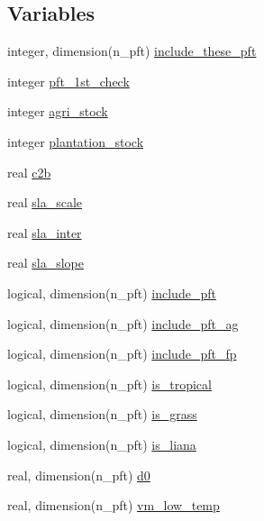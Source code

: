 \subsection*{Variables}
\begin{DoxyCompactItemize}
\item 
integer, dimension(n\+\_\+pft) \hyperlink{namespacepft__coms_a7ab2f215846d8f15e70deeb77fa8802e}{include\+\_\+these\+\_\+pft}
\item 
integer \hyperlink{namespacepft__coms_a46f15da0b9bf81a4f8bdba850efff1c8}{pft\+\_\+1st\+\_\+check}
\item 
integer \hyperlink{namespacepft__coms_afa924efff5f6897a77ef72109bfb8811}{agri\+\_\+stock}
\item 
integer \hyperlink{namespacepft__coms_abade08057c8846615ec5ff4ff9d3ffa2}{plantation\+\_\+stock}
\item 
real \hyperlink{namespacepft__coms_a2613e7dd1fa05af83d058d81f92946ec}{c2b}
\item 
real \hyperlink{namespacepft__coms_a1ba9e47e49347dca3d82a5d2a694136d}{sla\+\_\+scale}
\item 
real \hyperlink{namespacepft__coms_a7f2175fb500b1a4a0558108744ef6da8}{sla\+\_\+inter}
\item 
real \hyperlink{namespacepft__coms_abac97f719f7239eac0e2ad92dc9a8bef}{sla\+\_\+slope}
\item 
logical, dimension(n\+\_\+pft) \hyperlink{namespacepft__coms_a01416a40237dfc9b75e2205ff91ef2be}{include\+\_\+pft}
\item 
logical, dimension(n\+\_\+pft) \hyperlink{namespacepft__coms_a39d76f589c044b393db74ff7392193c7}{include\+\_\+pft\+\_\+ag}
\item 
logical, dimension(n\+\_\+pft) \hyperlink{namespacepft__coms_adc76e53cf81aef56357b589214fd3700}{include\+\_\+pft\+\_\+fp}
\item 
logical, dimension(n\+\_\+pft) \hyperlink{namespacepft__coms_ae26d357a418f5441d136c81e335cd633}{is\+\_\+tropical}
\item 
logical, dimension(n\+\_\+pft) \hyperlink{namespacepft__coms_a74313e4ba2eb3134ae662a573ee862e4}{is\+\_\+grass}
\item 
logical, dimension(n\+\_\+pft) \hyperlink{namespacepft__coms_a72d72373c3e4e66defb4dc9923258e42}{is\+\_\+liana}
\item 
real, dimension(n\+\_\+pft) \hyperlink{namespacepft__coms_aafd962aec98e7e8c1cfefd6543409bd5}{d0}
\item 
real, dimension(n\+\_\+pft) \hyperlink{namespacepft__coms_abc805ab81f6ae61cf4ccfb36fd352fdc}{vm\+\_\+low\+\_\+temp}

\end{DoxyCompactItemize}

